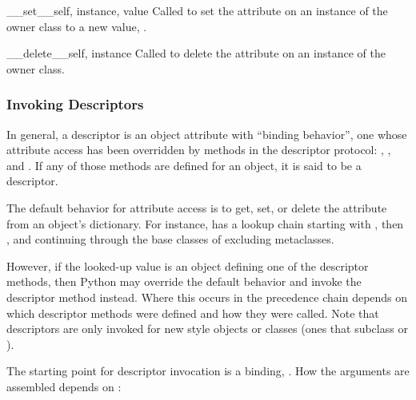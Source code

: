 \begin{methoddesc}[object]{__set__}{self, instance, value}
Called to set the attribute on an instance  of the owner
class to a new value, .
\end{methoddesc}

\begin{methoddesc}[object]{__delete__}{self, instance}
Called to delete the attribute on an instance  of the
owner class.
\end{methoddesc}


\subsubsection{Invoking Descriptors \label{descriptor-invocation}}

In general, a descriptor is an object attribute with ``binding behavior'',
one whose attribute access has been overridden by methods in the descriptor
protocol:  , , and .
If any of those methods are defined for an object, it is said to be a
descriptor.

The default behavior for attribute access is to get, set, or delete the
attribute from an object's dictionary. For instance,  has a
lookup chain starting with , then
, and continuing 
through the base classes of  excluding metaclasses.

However, if the looked-up value is an object defining one of the descriptor
methods, then Python may override the default behavior and invoke the
descriptor method instead.  Where this occurs in the precedence chain depends
on which descriptor methods were defined and how they were called.  Note that
descriptors are only invoked for new style objects or classes
(ones that subclass  or ).

The starting point for descriptor invocation is a binding, .
How the arguments are assembled depends on :

